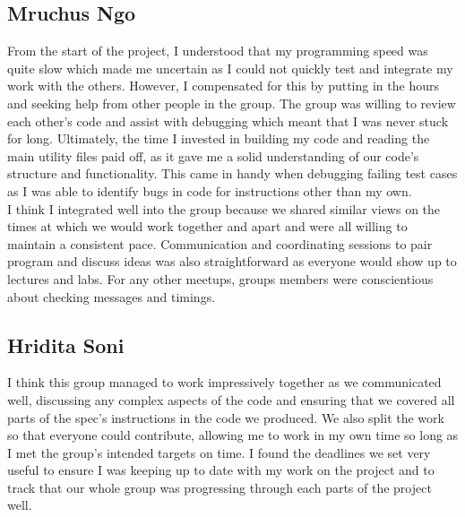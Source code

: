 \documentclass{article}
\begin{document}
\subsection{Mruchus Ngo}
From the start of the project, I understood that my programming speed was quite slow which made me uncertain as I could not quickly test and integrate my work with the others. However, I compensated for this by putting in the hours and seeking help from other people in the group. The group was willing to review each other's code and assist with debugging which meant that I was never stuck for long. Ultimately, the time I invested in building my code and reading the main utility files paid off, as it gave me a solid understanding of our code's structure and functionality. This came in handy when debugging failing test cases as I was able to identify bugs in code for instructions other than my own.\\

I think I integrated well into the group because we shared similar views on the times at which we would work together and apart and were all willing to maintain a consistent pace. Communication and coordinating sessions to pair program and discuss ideas was also straightforward as everyone would show up to lectures and labs. For any other meetups, groups members were conscientious about checking messages and timings.\\

\subsection{Hridita Soni}
I think this group managed to work impressively together as we communicated well, discussing any complex aspects of the code and ensuring that we covered all parts of the spec’s instructions in the code we produced. We also split the work so that everyone could contribute, allowing me to work in my own time so long as I met the group’s intended targets on time. I found the deadlines we set very useful to ensure I was keeping up to date with my work on the project and to track that our whole group was progressing through each parts of the project well. 
\end{document}
